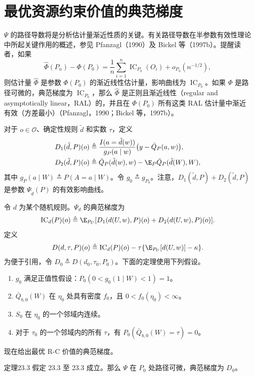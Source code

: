 \section{最优资源约束价值的典范梯度}

$\Psi$ 的路径导数将是分析估计量渐近性质的关键。有关路径导数在半参数有效性理论中所起关键作用的概述，参见 Pfanzagl（1990）及 Bickel 等（1997b）。提醒读者，如果
\[
 \hat\Phi(P_n)-\Phi(P_0)=\frac1n\sum_{i=1}^n\operatorname{IC}_{P_0}(O_i)+o_{P_0}(n^{-1/2}),
\]
则估计量 $\hat\Phi$ 是参数 $\Phi(P_0)$ 的渐近线性估计量，影响曲线为 $\operatorname{IC}_{P_0}$。如果 $\Phi$ 是路径可微的，典范梯度为 $\operatorname{IC}_{P_0}$，那么 $\hat\Phi$ 是正则且渐近线性（regular and asymptotically linear，RAL）的，并且在 $\Phi(P_0)$ 所有这类 RAL 估计量中渐近有效（方差最小）（Pfanzagl，1990；Bickel 等，1997b）。

对于 $o\in\mathcal O$、确定性规则 $\tilde d$ 和实数 $\tau$，定义
\[
\begin{aligned}
 D_1(\tilde d,P)(o)&\triangleq\frac{I(a=\tilde d(w))}{g_P(a\mid w)}\bigl(y-\bar Q_P(a,w)\bigr),\\
 D_2(\tilde d,P)(o)&\triangleq\bar Q_P(\tilde d(w),w)-\E_P\bar Q_P(\tilde d(W),W),
\end{aligned}
\]
其中 $g_P(a\mid W)\triangleq P(A=a\mid W)$。令 $g_0\triangleq g_{P_0}$。注意，$D_1(\tilde d,P)+D_2(\tilde d,P)$ 是参数 $\Psi_{\tilde d}(P)$ 的有效影响曲线。

令 $d$ 为某个随机规则。$\Psi_d$ 的典范梯度为
\[
 \operatorname{IC}_d(P)(o)\triangleq\E_{P_U}[D_1(d(U,w),P)(o)+D_2(d(U,w),P)(o)].
\]
定义
\[
 D(d,\tau,P)(o)\triangleq\operatorname{IC}_d(P)(o)-\tau\{\E_{P_U}[d(U,w)]-\kappa\}.
\]
为便于引用，令 $D_0\triangleq D(d_0,\tau_0,P_0)$。下面的定理使用下列假设。
\begin{enumerate}[label=(C\arabic*),leftmargin=3.6em]
\item $g_0$ 满足正值性假设：$P_0(0<g_0(1\mid W)<1)=1$。
\item $\bar Q_{b,0}(W)$ 在 $\eta_0$ 处具有密度 $f_0$，且 $0<f_0(\eta_0)<\infty$。
\item $S_0$ 在 $\eta_0$ 的一个邻域内连续。
\item 对于 $\tau_0$ 的一个邻域内的所有 $\tau$，有 $P_0(\bar Q_{b,0}(W)=\tau)=0$。
\end{enumerate}
现在给出最优 R-C 价值的典范梯度。

\begin{bookresult}{定理}{23.3}
假定 23.3 至 23.3 成立。那么 $\Psi$ 在 $P_0$ 处路径可微，典范梯度为 $D_0$。
\end{bookresult}

